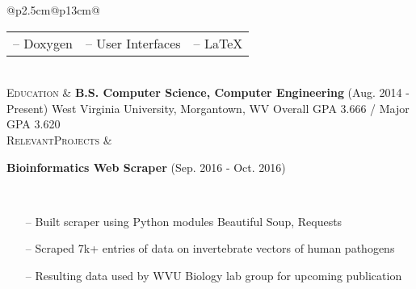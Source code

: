 \documentclass{article}
\begin{document}
\begin{tabular}{@{}p{2.5cm}@{\hspace{0.2cm}}p{13cm}@{}}
\begin{tabular}{@{}lll@{}}
-- Doxygen &
-- User Interfaces &
-- \LaTeX \\

\end{tabular} \\


\enspace\textsc{Education} &
\enspace\textbf{B.S. Computer Science, Computer Engineering}
\hfill\small(Aug. 2014 - Present)\normalsize
\newline West Virginia University, Morgantown, WV \small
\newline Overall GPA 3.666 / Major GPA 3.620
\normalsize \\


\enspace\textsc{Relevant}\newline\textsc{Projects} &

\enspace\textbf{Bioinformatics Web Scraper}
\hfill\small(Sep. 2016 - Oct. 2016)\normalsize
\par\,\small
\begin{itemize}[leftmargin=*,nolistsep,noitemsep]
  \item[--]Built scraper using Python modules Beautiful Soup, Requests
  \item[--]Scraped 7k+ entries of data on invertebrate vectors of human pathogens
  \item[--]Resulting data used by WVU Biology lab group for upcoming publication
\end{itemize} \\
\normalsize

\end{tabular}
\end{document}
